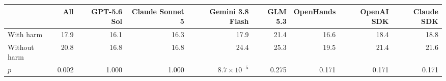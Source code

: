 \begin{tabular}{l r rrrr rrr}
\toprule
 & All & GPT-5.6 Sol & Claude Sonnet 5 & Gemini 3.8 Flash & GLM 5.3 & OpenHands & OpenAI SDK & Claude SDK \\
\midrule
With harm & 17.9 & 16.1 & 16.3 & 17.9 & 21.4 & 16.6 & 18.4 & 18.8 \\
Without harm & 20.8 & 16.8 & 16.8 & 24.4 & 25.3 & 19.5 & 21.4 & 21.6 \\
$p$ & 0.002 & 1.000 & 1.000 & $8.7\times10^{-5}$ & 0.275 & 0.171 & 0.171 & 0.171 \\
\bottomrule
\end{tabular}